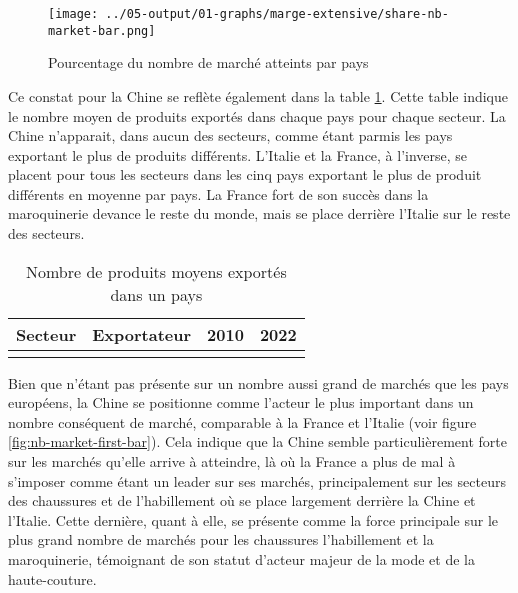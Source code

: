 \documentclass[french,10pt,a4paper]{article}
\begin{document}
\begin{figure}[!h]
  \centering
  \texttt{[image: ../05-output/01-graphs/marge-extensive/share-nb-market-bar.png]}
  \caption{Pourcentage du nombre de marché atteints par pays}
  \label{fig:nb-market-bar}
\end{figure}

Ce constat pour la Chine se reflète également dans la table \ref{tab:table-nb-mean-product-export}. Cette table indique le nombre moyen de produits exportés dans chaque pays pour chaque secteur. La Chine n'apparait, dans aucun des secteurs, comme étant parmis les pays exportant le plus de produits différents. L'Italie et la France, à l'inverse, se placent pour tous les secteurs dans les cinq pays exportant le plus de produit différents en moyenne par pays. La France fort de son succès dans la maroquinerie devance le reste du monde, mais se place derrière l'Italie sur le reste des secteurs.

\begin{table}[ht]
  \centering
  \begin{tabular}{lrrr}
    \hline
   Secteur & Exportateur & 2010 & 2022 \\
    \hline
    \\
    \hline
  \end{tabular}
  \caption{Nombre de produits moyens exportés dans un pays}
  \label{tab:table-nb-mean-product-export}
\end{table}

Bien que n'étant pas présente sur un nombre aussi grand de marchés que les pays européens, la Chine se positionne comme l'acteur le plus important dans un nombre conséquent de marché, comparable à la France et l'Italie (voir figure \ref{fig:nb-market-first-bar}). Cela indique que la Chine semble particulièrement forte sur les marchés qu'elle arrive à atteindre, là où la France a plus de mal à s'imposer comme étant un leader sur ses marchés, principalement sur les secteurs des chaussures et de l'habillement où se place largement derrière la Chine et l'Italie. Cette dernière, quant à elle, se présente comme la force principale sur le plus grand nombre de marchés pour les chaussures l'habillement et la maroquinerie, témoignant de son statut d'acteur majeur de la mode et de la haute-couture. 
\end{document}
